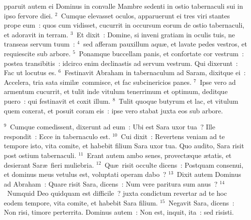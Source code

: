 \bchapter
{}pparuit autem ei Dominus in convalle Mambre sedenti in ostio tabernaculi sui in ipso fervore diei.
${}^{2}$~Cumque elevasset oculos, apparuerunt ei tres viri stantes prope eum~: quos cum vidisset, cucurrit in occursum eorum de ostio tabernaculi, et adoravit in terram.
${}^{3}$~Et dixit~: Domine, si inveni gratiam in oculis tuis, ne transeas servum tuum~:
${}^{4}$~sed afferam pauxillum aqu\ae , et lavate pedes vestros, et requiescite sub arbore.
${}^{5}$~Ponamque buccellam panis, et confortate cor vestrum~: postea transibitis~: idcirco enim declinastis ad servum vestrum. Qui dixerunt~: Fac ut locutus es.
${}^{6}$~Festinavit Abraham in tabernaculum ad Saram, dixitque ei~: Accelera, tria sata simil\ae\ commisce, et fac subcinericios panes.
${}^{7}$~Ipse vero ad armentum cucurrit, et tulit inde vitulum tenerrimum et optimum, deditque puero~: qui festinavit et coxit illum.
${}^{8}$~Tulit quoque butyrum et lac, et vitulum quem coxerat, et posuit coram eis~: ipse vero stabat juxta eos sub arbore.


${}^{9}$~Cumque comedissent, dixerunt ad eum~: Ubi est Sara uxor tua~? Ille respondit~: Ecce in tabernaculo est.
${}^{10}$~Cui dixit~: Revertens veniam ad te tempore isto, vita comite, et habebit filium Sara uxor tua. Quo audito, Sara risit post ostium tabernaculi.
${}^{11}$~Erant autem ambo senes, provect\ae que \ae tatis, et desierant Sar\ae\ fieri muliebria.
${}^{12}$~Qu\ae\ risit occulte dicens~: Postquam consenui, et dominus meus vetulus est, voluptati operam dabo~?
${}^{13}$~Dixit autem Dominus ad Abraham~: Quare risit Sara, dicens~: Num vere paritura sum anus~?
${}^{14}$~Numquid Deo quidquam est difficile~? juxta condictum revertar ad te hoc eodem tempore, vita comite, et habebit Sara filium.
${}^{15}$~Negavit Sara, dicens~: Non risi, timore perterrita. Dominus autem~: Non est, inquit, ita~: sed risisti.



